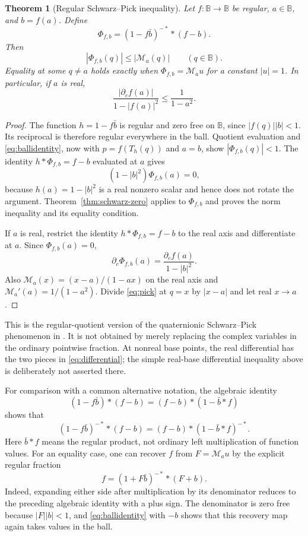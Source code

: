 \documentclass[11pt,a4paper]{article}
\numberwithin{equation}{section}
\newtheorem{theorem}{Theorem}[section]
\theoremstyle{definition}
\theoremstyle{remark}
\newcommand{\BB}{\mathbb B}
\newcommand{\pc}{\partial_c}
\begin{document}
\begin{theorem}[Regular Schwarz--Pick inequality]
\label{thm:pick}
Let $f:\BB\to\BB$ be regular, $a\in\BB$, and $b=f(a)$. Define
\begin{equation}
 \Phi_{f,b}=(1-f\bar b)^{-*}*(f-b).
 \label{eq:normalized-f}
\end{equation}
Then
\begin{equation}
 |\Phi_{f,b}(q)|\le|\mathcal M_a(q)|\qquad(q\in\BB).
 \label{eq:pick}
\end{equation}
Equality at some $q\ne a$ holds exactly when
$\Phi_{f,b}=\mathcal M_a u$ for a constant $|u|=1$.
In particular, if $a$ is real,
\begin{equation}
 \frac{|\pc f(a)|}{1-|f(a)|^2}\le\frac1{1-a^2}.
 \label{eq:real-pick-derivative}
\end{equation}
\end{theorem}
\begin{proof}
The function $h=1-f\bar b$ is regular and zero free on $\BB$, since
$|f(q)||b|<1$. Its reciprocal is therefore regular everywhere in the ball.
Quotient evaluation and \eqref{eq:ballidentity}, now with
$p=f(T_h(q))$ and $a=b$, show $|\Phi_{f,b}(q)|<1$.
The identity $h*\Phi_{f,b}=f-b$ evaluated at $a$ gives
\[
 (1-|b|^2)\Phi_{f,b}(a)=0,
\]
because $h(a)=1-|b|^2$ is a real nonzero scalar and hence does not rotate
the argument. Theorem~\ref{thm:schwarz-zero} applies to $\Phi_{f,b}$ and
proves the norm inequality and its equality condition.

If $a$ is real, restrict the identity $h*\Phi_{f,b}=f-b$ to the real axis
and differentiate at $a$. Since $\Phi_{f,b}(a)=0$,
\[
 \pc\Phi_{f,b}(a)=\frac{\pc f(a)}{1-|b|^2}.
\]
Also $\mathcal M_a(x)=(x-a)/(1-ax)$ on the real axis and
$\mathcal M_a'(a)=1/(1-a^2)$. Divide \eqref{eq:pick} at $q=x$ by $|x-a|$
and let real $x\to a$.
\end{proof}
This is the regular-quotient version of the quaternionic Schwarz--Pick
phenomenon in \cite{BS}. It is not obtained by merely replacing the complex
variables in the ordinary pointwise fraction. At nonreal base points, the
real differential has the two pieces in \eqref{eq:differential}; the simple
real-base differential inequality above is deliberately not asserted there.

For comparison with a common alternative notation, the algebraic identity
\[
 (1-f\bar b)*(f-b)=(f-b)*(1-\bar b*f)
\]
shows that
\[
 (1-f\bar b)^{-*}*(f-b)=(f-b)*(1-\bar b*f)^{-*}.
\]
Here $\bar b*f$ means the regular product, not ordinary left multiplication of
function values. For an equality case, one can recover $f$ from
$F=\mathcal M_a u$ by the explicit regular fraction
\[
 f=(1+F\bar b)^{-*}*(F+b).
\]
Indeed, expanding either side after multiplication by its denominator reduces
to the preceding algebraic identity with a plus sign. The denominator is zero
free because $|F||b|<1$, and \eqref{eq:ballidentity} with $-b$ shows that this
recovery map again takes values in the ball.
\end{document}

